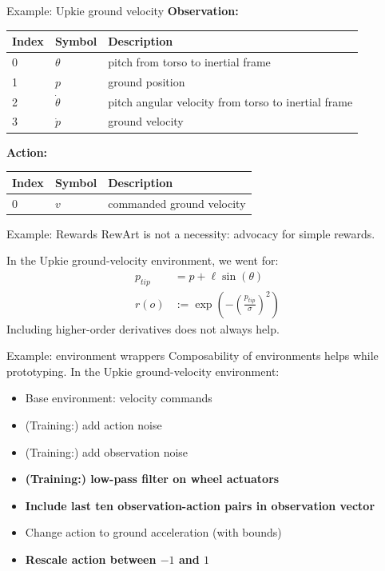 \documentclass[10pt, aspectratio=1610]{beamer}
\begin{document}
\begin{frame}{Example: Upkie ground velocity}
    \textbf{Observation:}
    \begin{table}
        \begin{tabular}{|l|l|l|}
            \hline
            \textbf{Index} & \textbf{Symbol} & \textbf{Description} \\
            \hline
            0 & $\theta$ & pitch from torso to inertial frame \\
            1 & $p$ & ground position \\
            2 & $\dot{\theta}$ & pitch angular velocity from torso to inertial frame \\
            3 & $\dot{p}$ & ground velocity \\
            \hline
        \end{tabular}
    \end{table}
    \textbf{Action:}
    \begin{table}
        \begin{tabular}{|l|l|l|}
            \hline
            \textbf{Index} & \textbf{Symbol} & \textbf{Description} \\
            \hline
            0 & $v$ & commanded ground velocity \\
            \hline
        \end{tabular}
    \end{table}
\end{frame}

\begin{frame}{Example: Rewards}
    RewArt is not a necessity: advocacy for simple rewards.

    In the Upkie ground-velocity environment, we went for:
    \begin{align*}
        p_{\mathit{tip}} & = p + \ell \sin(\theta) \\
        r(o) & := \exp\left(-\left(\frac{p_{\mathit{tip}}}{\sigma}\right)^2\right)
    \end{align*}
    Including higher-order derivatives does not always help.
\end{frame}

\begin{frame}{Example: environment wrappers}
    Composability of environments helps while prototyping. In the Upkie
    ground-velocity environment:
    \begin{itemize}
        \item Base environment: velocity commands
        \item (Training:) add action noise
        \item (Training:) add observation noise
        \item \textbf{(Training:) low-pass filter on wheel actuators}
        \item \textbf{Include last ten observation-action pairs in observation vector}
        \item Change action to ground acceleration (with bounds)
        \item \textbf{Rescale action between $-1$ and $1$}
    \end{itemize}
\end{frame}
\end{document}
